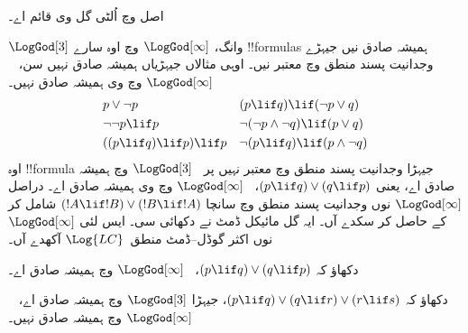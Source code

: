 \documentclass[../../../include/open-logic-section]{subfiles}
\begin{document}
اصل وچ اُلٹی گل وی قائم اے۔

$\LogGod[3]$ وانگ، $\LogGod[\infty]$ وچ اوہ سارے !!{formula}s
ہمیشہ صادق نیں جیہڑے وجدانیت پسند منطق وچ معتبر نیں۔ اوہی
مثالاں جیہڑیاں ہمیشہ صادق نہیں سن، ~$\LogGod[\infty]$ وچ وی
ہمیشہ صادق نہیں۔
\begin{align*}
  & p \lor \lnot p && (p \lif q) \lif (\lnot p \lor q) \\
  & \lnot\lnot p \lif p && \lnot(\lnot p \land \lnot q) \lif (p \lor q) \\
  & ((p \lif q) \lif p) \lif p && \lnot(p \lif q) \lif (p \land \lnot q)
\end{align*}
اوہ !!{formula} جیہڑا وجدانیت پسند منطق وچ معتبر نہیں پر
~$\LogGod[3]$ وچ ہمیشہ صادق اے، یعنی $(p \lif q) \lor (q \lif
p)$، ~$\LogGod[\infty]$ وچ وی ہمیشہ صادق اے۔ دراصل
$\LogGod[\infty]$ نوں وجدانیت پسند منطق وچ سانچا
$(!A \lif !B) \lor (!B \lif !A)$ شامل کر کے حاصل کر سکدے آں۔
ایہ گل مائیکل ڈمٹ نے دکھائی سی۔ ایس لئی $\LogGod[\infty]$
نوں اکثر گوڈل–ڈمٹ منطق~$\Log{LC}$ آکھدے آں۔

\begin{prob}
  دکھاؤ کہ $(p \lif q) \lor (q \lif p)$، ~$\LogGod[\infty]$
  وچ ہمیشہ صادق اے۔
\end{prob}

\begin{prob}
  دکھاؤ کہ $(p \lif q) \lor (q \lif r) \lor (r \lif s)$،
  جیہڑا $\LogGod[3]$ وچ ہمیشہ صادق اے، ~$\LogGod[\infty]$ وچ
  ہمیشہ صادق نہیں۔
\end{prob}
\end{document}
